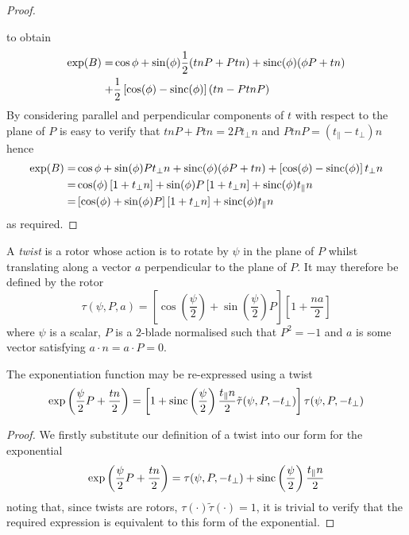 \begin{proof}
\begin{centering}
\end{centering}

\noindent to obtain
\begin{align*}
\exp(B) = & 
  \cos \phi + \sin(\phi) \frac{1}{2} (tnP + Ptn) + \mathrm{sinc}(\phi) (\phi P + tn) \\
+ & \frac{1}{2} \left[ \cos(\phi) - \mathrm{sinc}(\phi) \right] (tn - PtnP)
\end{align*}
By considering parallel and perpendicular components of $t$ with
respect to the plane of $P$ is easy to verify that
$tnP + Ptn = 2 Pt_\perp n$ and $PtnP = (t_\parallel - t_\perp)n$ hence
\begin{align*}
\exp(B) = & 
  \cos \phi + \sin(\phi) P t_\perp n + \mathrm{sinc}(\phi) (\phi P + tn) + \left[ \cos(\phi) - \mathrm{sinc}(\phi) \right] t_\perp n \\
  = & \cos (\phi) \left[ 1 + t_\perp n \right] +
  \sin(\phi) P \left[ 1 + t_\perp n \right] + \mathrm{sinc}(\phi) t_\parallel n \\
  = & \left[ \cos(\phi) + \sin(\phi) P \right] \left[ 1 + t_\perp n \right] + \mathrm{sinc}(\phi) t_\parallel n 
\end{align*}
as required.
\end{proof}

\begin{definition}
A \emph{twist} is a rotor whose action is to rotate by $\psi$ in the 
plane of $P$ whilst translating along a vector $a$ perpendicular to
the plane of $P$. It may therefore be 
defined by the rotor 
\[
\tau(\psi, P, a) =
 \left[ \cos\left(\frac{\psi}{2}\right) +
   \sin\left(\frac{\psi}{2}\right)P
 \right]
 \left[
   1 + \frac{na}{2}
 \right]
\]
where $\psi$ is a scalar, $P$ is a $2$-blade normalised such that 
$P^2 = -1$ and $a$ is some vector satisfying $a \cdot n = a \cdot P = 0$.
\end{definition}

\begin{lemma}
The exponentiation function may be re-expressed using a twist
\[
\exp\left(\frac{\psi}{2}P + \frac{tn}{2}\right) =
\left[ 1 + \mathrm{sinc}\left(\frac{\psi}{2}\right)\frac{t_\parallel n}{2} \tilde{\tau}(\psi, P, - t_\perp) \right]
\tau(\psi, P, - t_\perp)
\]
\end{lemma}
\begin{proof}
We firstly substitute our definition of a twist into our form for the exponential
\begin{equation}
\exp\left(\frac{\psi}{2}P + \frac{tn}{2}\right) =
\tau(\psi, P, - t_\perp) + \mathrm{sinc}\left(\frac{\psi}{2}\right)\frac{t_\parallel n}{2}
\label{eqn:twistform}
\end{equation}
noting that, since twists are rotors, $\tau( \cdot ) \tilde{\tau}(\cdot) = 1$, it is
trivial to verify that the required expression is equivalent to this form of the exponential.
\end{proof}

